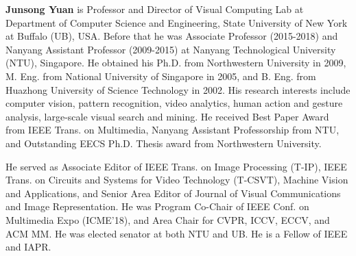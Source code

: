 \documentclass[journal]{IEEEtran}
\begin{document}
\vspace{-1.0cm}

\begin{IEEEbiography}
{\textbf{Junsong Yuan}} is Professor and Director of Visual Computing Lab at Department of Computer Science and Engineering, State University of New York at Buffalo (UB), USA. Before that he was Associate Professor (2015-2018) and Nanyang Assistant Professor (2009-2015) at Nanyang Technological University (NTU), Singapore. He obtained his Ph.D. from Northwestern University in 2009, M. Eng. from National University of Singapore in 2005, and B. Eng. from Huazhong University of Science Technology in 2002. His research interests include computer vision, pattern recognition, video analytics, human action and gesture analysis, large-scale visual search and mining. He received Best Paper Award from IEEE Trans. on Multimedia, Nanyang Assistant Professorship from NTU, and Outstanding EECS Ph.D. Thesis award from Northwestern University. 

He served as Associate Editor of IEEE Trans. on Image Processing (T-IP), IEEE Trans. on Circuits and Systems for Video Technology (T-CSVT), Machine Vision and Applications, and Senior Area Editor of Journal of Visual Communications and Image Representation. He was Program Co-Chair of IEEE Conf. on Multimedia Expo (ICME'18), and Area Chair for CVPR, ICCV, ECCV, and ACM MM. He was elected senator at both NTU and UB. He is a Fellow of IEEE and IAPR.
\end{IEEEbiography}
\end{document}
